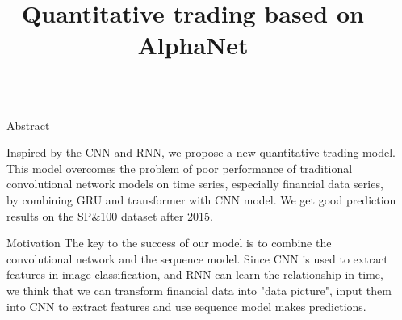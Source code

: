 \documentclass[final]{beamer}
\title{Quantitative trading based on AlphaNet}
\newlength{\sepwidth}
\newlength{\colwidth}
\newcommand{\separatorcolumn}{\begin{column}{\sepwidth}\end{column}}
\begin{document}
\begin{frame}[t]
\begin{columns}[t]
\separatorcolumn

\begin{column}{\colwidth}

  \begin{block}{\Large Abstract}

    \large \textmd{Inspired by the CNN and RNN, we propose a new quantitative trading model. This model overcomes the problem of poor performance of traditional convolutional network models on time series, especially financial data series, by combining GRU and transformer with CNN model. We get good prediction results on the SP&100 dataset after 2015.}

  \end{block}
    
  \begin{block}{\Large Motivation}
    \large \textmd{The key to the success of our model is to combine the convolutional network and the sequence model. Since CNN is used to extract features in image classification, and RNN can learn the relationship in time, we think that we can transform financial data into "data picture", input them into CNN to extract features and use sequence model makes predictions.}
  \end{block}


\end{column}
\end{columns}
\end{frame}
\end{document}
